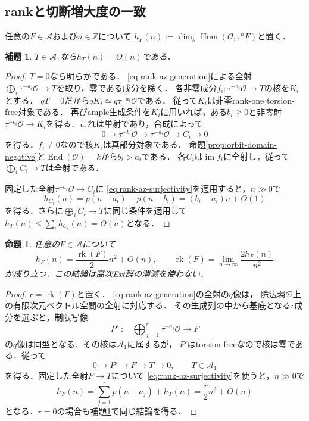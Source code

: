 \documentclass[11pt,a4paper]{ltjsarticle}
\newtheorem{proposition}[theorem]{命題}
\newtheorem{lemma}[theorem]{補題}
\theoremstyle{definition}
\newcommand{\OO}{\mathcal O}
\renewcommand{\AA}{\mathcal A}
\newcommand{\Hom}{\operatorname{Hom}}
\newcommand{\End}{\operatorname{End}}
\newcommand{\rk}{\operatorname{rk}}
\begin{document}
\subsection{rankと切断増大度の一致}
任意の$F\in\AA$および$n\in\mathbb Z$について
$h_F(n):=\dim_k\Hom(\OO,\tau^nF)$と置く．

\begin{lemma}\label{lem:torsion-linear-growth}
$T\in\AA_1$なら$h_T(n)=O(n)$である．
\end{lemma}

\begin{proof}
$T=0$なら明らかである．
\eqref{eq:rank-az-generation}による全射
$\bigoplus_i\tau^{-a_i}\OO\to T$を取り，零である成分を除く．
各非零成分$f_i:\tau^{-a_i}\OO\to T$の核を$K_i$とする．
$qT=0$だから$qK_i\simeq q\tau^{-a_i}\OO$である．
従って$K_i$は非零rank-one torsion-free対象である．
再びample生成条件を$K_i$に用いれば，ある$b_i\geq0$と非零射
$\tau^{-b_i}\OO\to K_i$を得る．これは単射であり，合成によって
\[
 0\longrightarrow\tau^{-b_i}\OO
   \longrightarrow\tau^{-a_i}\OO
   \longrightarrow C_i\longrightarrow0
\]
を得る．$f_i\ne0$なので核$K_i$は真部分対象である．
命題\ref{prop:orbit-domain-negative}と$\End(\OO)=k$から$b_i>a_i$である．
各$C_i$は$\operatorname{im}f_i$に全射し，従って
$\bigoplus_iC_i\to T$は全射である．

固定した全射$\tau^{-a_i}\OO\to C_i$に
\eqref{eq:rank-az-surjectivity}を適用すると，$n\gg0$で
\[
 h_{C_i}(n)=p(n-a_i)-p(n-b_i)
          =(b_i-a_i)n+O(1)
\]
を得る．さらに$\bigoplus_iC_i\to T$に同じ条件を適用して
$h_T(n)\leq\sum_i h_{C_i}(n)=O(n)$となる．
\end{proof}

\begin{proposition}\label{prop:rank-leading-hom}
任意の$F\in\AA$について
\begin{equation}\label{eq:rank-leading-hom}
 h_F(n)=\frac{\rk(F)}2 n^2+O(n),\qquad
 \rk(F)=\lim_{n\to\infty}\frac{2h_F(n)}{n^2}
\end{equation}
が成り立つ．この結論は高次Ext群の消滅を使わない．
\end{proposition}

\begin{proof}
$r=\rk(F)$と置く．
\eqref{eq:rank-az-generation}の全射の$q$像は，
除法環$\mathcal D$上の有限次元ベクトル空間の全射に対応する．
その生成列の中から基底となる$r$成分を選ぶと，制限写像
\[
 P':=\bigoplus_{j=1}^{r}\tau^{-a_j}\OO\longrightarrow F
\]
の$q$像は同型となる．その核は$\AA_1$に属するが，
$P'$はtorsion-freeなので核は零である．従って
\[
 0\longrightarrow P'\longrightarrow F\longrightarrow T\longrightarrow0,
 \qquad T\in\AA_1
\]
を得る．固定した全射$F\to T$について
\eqref{eq:rank-az-surjectivity}を使うと，$n\gg0$で
\[
 h_F(n)=\sum_{j=1}^{r}p(n-a_j)+h_T(n)
       =\frac r2n^2+O(n)
\]
となる．$r=0$の場合も補題\ref{lem:torsion-linear-growth}で同じ結論を得る．
\end{proof}
\end{document}
